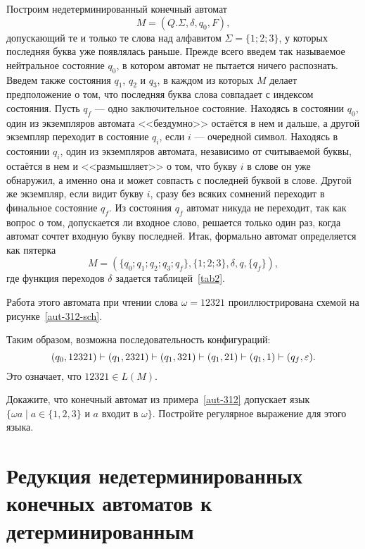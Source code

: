 \begin{myexample}\label{aut-312}
Построим недетерминированный конечный автомат
\[M=(Q.\Sigma,\delta, q_0, F),
\]
допускающий те и только те слова над алфавитом $\Sigma=\{1;2;3\}$, у которых последняя буква уже появлялась раньше. Прежде всего введем так называемое нейтральное состояние $q_0$, в котором автомат не пытается ничего распознать. Введем также состояния $q_1$, $q_2$ и $q_3$, в каждом из которых $M$ делает предположение о том, что последняя буква слова совпадает с индексом состояния. Пусть $q_f$ --- одно заключительное состояние. Находясь в состоянии $q_0$, один из экземпляров автомата <<бездумно>> остаётся в нем и дальше, а другой экземпляр переходит в состояние $q_i$, если $i$ --- очередной символ. Находясь в состоянии $q_i$, один из экземпляров автомата, независимо от считываемой буквы, остаётся в нем и <<размышляет>> о том, что букву $i$ в слове он уже обнаружил, а именно она и может совпасть с последней буквой в слове. Другой же экземпляр, если видит букву $i$, сразу без всяких сомнений переходит в финальное состояние $q_f$. Из состояния $q_f$ автомат никуда не переходит, так как вопрос о том, допускается ли входное слово, решается только один раз, когда автомат сочтет входную букву последней. Итак, формально автомат определяется как пятерка
\[
	M=(\{q_0;q_1;q_2;q_3;q_f\},\{1;2;3\},\delta,q,\{q_f\}),
\]
где функция переходов $\delta$ задается таблицей~\ref{tab2}.



Работа этого автомата при чтении слова $\omega=12321$ проиллюстрирована схемой на рисунке~\ref{aut-312-sch}.



Таким образом, возможна последовательность конфигураций:
\[
(q_0,12321)\vdash(q_1,2321)\vdash(q_1,321)\vdash(q_1,21)\vdash(q_1,1)\vdash(q_f,\varepsilon).
\]
Это означает, что $12321\in L(M)$.
\end{myexample}

\begin{myproblem}
Докажите, что конечный автомат из примера~\ref{aut-312} допускает язык $\{\omega a\mid a\in\{1,2,3\}$ и $a$ входит в $\omega\}$. Постройте регулярное выражение для этого языка.
\end{myproblem}

\section[Редукция НКА к ДКА]{Редукция недетерминированных конечных автоматов к детерминированным}
\label{Chapter3Reduct}

